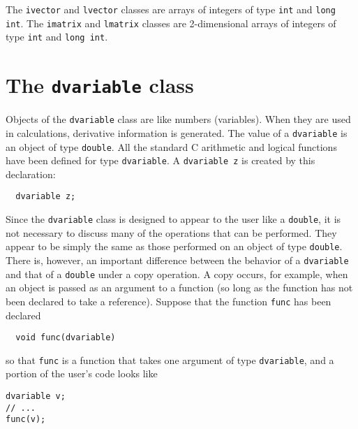 \documentclass{admbmanual}
\begin{document}
The \texttt{ivector} and \texttt{lvector} 
classes are arrays of integers of type
\texttt{int} and \texttt{long int}.
The \texttt{imatrix} and \texttt{lmatrix} classes are 2-dimensional 
arrays of integers of type \texttt{int} and \texttt{long~int}.


\section{The \texttt{dvariable} class}

Objects of the \texttt{dvariable} class are like numbers (variables).
When they are used in calculations, derivative information is generated. 
 The value of a \texttt{dvariable} is
an object of type \texttt{double}. All the standard C arithmetic and logical
functions have been defined for type \texttt{dvariable}. 
A \texttt{dvariable~z} is created by this declaration:
\begin{lstlisting}
  dvariable z;
\end{lstlisting}

Since the \texttt{dvariable} class is designed to appear to the user like
a \texttt{double},  it is not necessary to discuss many of the operations that
can be performed. They appear to be simply the same as those performed
on an object of type \texttt{double}.  There is, however, an important difference
between the behavior of a \texttt{dvariable} and that of a \texttt{double}
under a copy operation. A copy occurs, for example, when an 
object is passed as an argument
to a function (so long as the function has not been declared to take
a reference). Suppose that the function \texttt{func} has been declared
\begin{lstlisting}
  void func(dvariable)
\end{lstlisting}
so that \texttt{func} is a function that takes one argument of 
type \texttt{dvariable}, and a portion of the user's code looks like
\begin{lstlisting}
dvariable v;
// ...
func(v);
\end{lstlisting}
\end{document}
